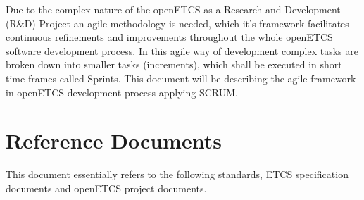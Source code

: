 Due to the complex nature of the openETCS as a  Research and Development (R\&D) Project an agile methodology is needed, which it's framework facilitates continuous refinements and improvements throughout the whole openETCS software development process. In this agile way of development complex tasks are broken down into smaller tasks (increments), which shall be executed in short time frames called Sprints. This document will be describing the agile framework in openETCS development process applying SCRUM.








\section{Reference Documents}
\label{sec:refdoc}

This document essentially refers to the following standards, ETCS specification documents and openETCS project documents.

